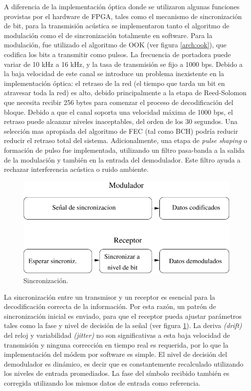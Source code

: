 A diferencia de la implementación óptica donde se utilizaron algunas funciones provistas por el hardware de FPGA, tales como el mecanismo de sincronización de bit, para la transmisión acústica se implementaron tanto el algoritmo de modulación como el de sincronización totalmente en software.
Para la modulación, fue utilizado el algoritmo de OOK (ver figura \ref{arch:ook}), que codifica los bits a transmitir como pulsos. La frecuencia de portadora puede variar de 10 kHz a 16 kHz, y la tasa de transmisión se fijo a 1000 bps. Debido a la baja velocidad de este canal se introduce un problema inexistente en la implementación óptica: el retraso de la red (el tiempo que tarda un bit en atravesar toda la red) es alto, debido principalmente a la etapa de Reed-Solomon que necesita recibir 256 bytes para comenzar el proceso de decodificación del bloque. Debido a que el canal soporta una velocidad máxima de 1000 bps, el retraso puede alcanzar niveles inaceptables, del orden de los 30 segundos.
Una selección mas apropiada del algoritmo de FEC (tal como BCH) podría reducir reducir el retraso total del sistema.
Adicionalmente, una etapa de \textit{pulse shaping} o formación de pulso fue implementada, utilizando un filtro pasa-banda a la salida de la modulación y también en la entrada del demodulador. Este filtro ayuda a rechazar interferencia acústica o ruido ambiente.

\begin{figure}[t]
  \centering
    \includegraphics[width=4.5in]{graphs/Audio-Sync2.pdf}
    \caption{Sincronización.}
    \label{arch:sync}
\end{figure}


La sincronización entre un transmisor y un receptor es esencial para la decodificación correcta de la información. Por esta razón, un patrón de sincronización inicial es enviado, para que el receptor pueda ajustar parámetros tales como la fase y nivel de decisión de la señal (ver figura \ref{arch:sync}). La deriva \textit{(drift)} del reloj y variabilidad \textit{(jitter)} no son significativas a esta baja velocidad de transmisión y ninguna corrección en tiempo real es requerida, por lo que la implementación del módem por software es simple.
El nivel de decisión del demodulador es dinámico, es decir que es constantemente recalculado utilizando los niveles de entrada promediados.
La fase del símbolo recibido también es corregida utilizando los mismos datos de entrada como referencia.

